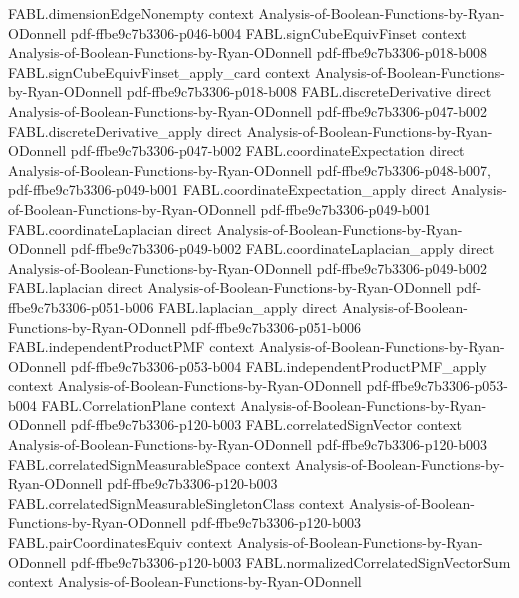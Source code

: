 \begin{theorem}
\proofstep
  {FABL.dimensionEdgeNonempty}
  {context}
  {Analysis-of-Boolean-Functions-by-Ryan-ODonnell}
  {pdf-ffbe9c7b3306-p046-b004}
\proofstep
  {FABL.signCubeEquivFinset}
  {context}
  {Analysis-of-Boolean-Functions-by-Ryan-ODonnell}
  {pdf-ffbe9c7b3306-p018-b008}
\proofstep
  {FABL.signCubeEquivFinset_apply_card}
  {context}
  {Analysis-of-Boolean-Functions-by-Ryan-ODonnell}
  {pdf-ffbe9c7b3306-p018-b008}
\proofstep
  {FABL.discreteDerivative}
  {direct}
  {Analysis-of-Boolean-Functions-by-Ryan-ODonnell}
  {pdf-ffbe9c7b3306-p047-b002}
\proofstep
  {FABL.discreteDerivative_apply}
  {direct}
  {Analysis-of-Boolean-Functions-by-Ryan-ODonnell}
  {pdf-ffbe9c7b3306-p047-b002}
\proofstep
  {FABL.coordinateExpectation}
  {direct}
  {Analysis-of-Boolean-Functions-by-Ryan-ODonnell}
  {pdf-ffbe9c7b3306-p048-b007,
    pdf-ffbe9c7b3306-p049-b001}
\proofstep
  {FABL.coordinateExpectation_apply}
  {direct}
  {Analysis-of-Boolean-Functions-by-Ryan-ODonnell}
  {pdf-ffbe9c7b3306-p049-b001}
\proofstep
  {FABL.coordinateLaplacian}
  {direct}
  {Analysis-of-Boolean-Functions-by-Ryan-ODonnell}
  {pdf-ffbe9c7b3306-p049-b002}
\proofstep
  {FABL.coordinateLaplacian_apply}
  {direct}
  {Analysis-of-Boolean-Functions-by-Ryan-ODonnell}
  {pdf-ffbe9c7b3306-p049-b002}
\proofstep
  {FABL.laplacian}
  {direct}
  {Analysis-of-Boolean-Functions-by-Ryan-ODonnell}
  {pdf-ffbe9c7b3306-p051-b006}
\proofstep
  {FABL.laplacian_apply}
  {direct}
  {Analysis-of-Boolean-Functions-by-Ryan-ODonnell}
  {pdf-ffbe9c7b3306-p051-b006}
\proofstep
  {FABL.independentProductPMF}
  {context}
  {Analysis-of-Boolean-Functions-by-Ryan-ODonnell}
  {pdf-ffbe9c7b3306-p053-b004}
\proofstep
  {FABL.independentProductPMF_apply}
  {context}
  {Analysis-of-Boolean-Functions-by-Ryan-ODonnell}
  {pdf-ffbe9c7b3306-p053-b004}
\proofstep
  {FABL.CorrelationPlane}
  {context}
  {Analysis-of-Boolean-Functions-by-Ryan-ODonnell}
  {pdf-ffbe9c7b3306-p120-b003}
\proofstep
  {FABL.correlatedSignVector}
  {context}
  {Analysis-of-Boolean-Functions-by-Ryan-ODonnell}
  {pdf-ffbe9c7b3306-p120-b003}
\proofstep
  {FABL.correlatedSignMeasurableSpace}
  {context}
  {Analysis-of-Boolean-Functions-by-Ryan-ODonnell}
  {pdf-ffbe9c7b3306-p120-b003}
\proofstep
  {FABL.correlatedSignMeasurableSingletonClass}
  {context}
  {Analysis-of-Boolean-Functions-by-Ryan-ODonnell}
  {pdf-ffbe9c7b3306-p120-b003}
\proofstep
  {FABL.pairCoordinatesEquiv}
  {context}
  {Analysis-of-Boolean-Functions-by-Ryan-ODonnell}
  {pdf-ffbe9c7b3306-p120-b003}
\proofstep
  {FABL.normalizedCorrelatedSignVectorSum}
  {context}
  {Analysis-of-Boolean-Functions-by-Ryan-ODonnell}

\end{theorem}
